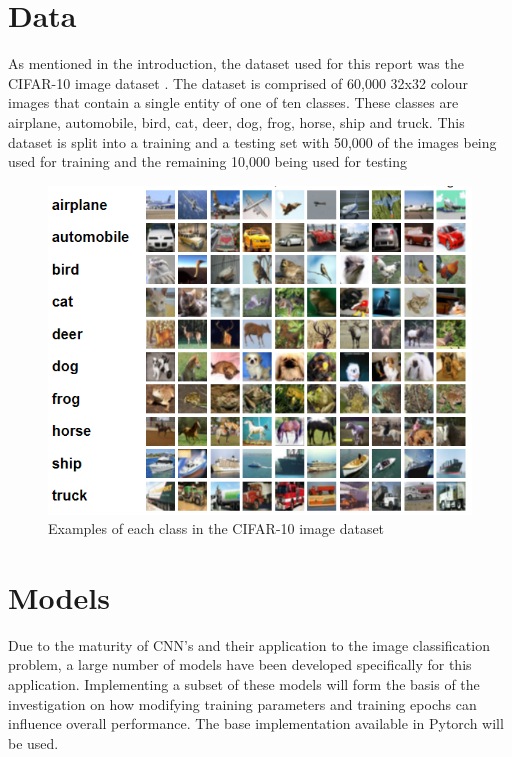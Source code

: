 \documentclass[10pt,twocolumn,letterpaper]{article}
\begin{document}
\section{Data}
As mentioned in the introduction, the dataset used for this report was the CIFAR-10 image 
dataset \cite{cifar-10}. The dataset is comprised of 60,000 32x32 colour images that contain 
a single entity of one of ten classes. These classes are airplane, automobile, bird, cat, deer,
 dog, frog, horse, ship and truck. This dataset is split into a training and a testing 
set with 50,000 of the images being used for training and the remaining 10,000 being used 
for testing

\begin{center}
   \begin{figure}[H]
   \includegraphics[scale=0.7]{cifar10.PNG}
   \caption{Examples of each class in the CIFAR-10 image dataset }
   \end{figure}
\end{center}

\section{Models}
Due to the maturity of CNN's and their application to the image classification problem,
a large number of models have been developed specifically for this application. Implementing 
a subset of these models will form the basis of the investigation on how modifying 
training parameters and training epochs can influence overall performance. The base implementation 
available in Pytorch will be used. 
\end{document}
